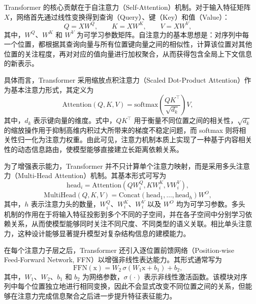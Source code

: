 Transformer 的核心贡献在于自注意力（Self-Attention）机制。对于输入特征矩阵 $X$，网络首先通过线性变换得到查询（Query）、键（Key）和值（Value）：
\begin{equation}
Q = XW^Q,\qquad
K = XW^K,\qquad
V = XW^V,
\end{equation}
其中，$W^Q$、$W^K$ 和 $W^V$ 为可学习参数矩阵。自注意力的基本思想是：对序列中每一个位置，都根据其查询向量与所有位置键向量之间的相似性，计算该位置对其他位置的关注程度，再对对应的值向量进行加权聚合，从而获得包含全局上下文信息的新表示。

具体而言，Transformer 采用缩放点积注意力（Scaled Dot-Product Attention）作为基本注意力形式，其定义为
\begin{equation}
\mathrm{Attention}(Q,K,V)
=
\mathrm{softmax}\left(\frac{QK^\top}{\sqrt{d_k}}\right)V,
\label{eq:transformer_attention}
\end{equation}
其中，$d_k$ 表示键向量的维度。式中，$QK^\top$ 用于衡量不同位置之间的相关性，$\sqrt{d_k}$ 的缩放操作用于抑制高维内积过大所带来的梯度不稳定问题，而 softmax 则将相关性归一化为注意力权重。由此可见，注意力机制本质上实现了一种基于内容相关性的动态信息路由，使模型能够直接建立长距离依赖关系。

为了增强表示能力，Transformer 并不只计算单个注意力映射，而是采用多头注意力（Multi-Head Attention）机制。其基本形式可写为
\begin{equation}
\mathrm{head}_i
=
\mathrm{Attention}(QW_i^Q,KW_i^K,VW_i^V),
\end{equation}
\begin{equation}
\mathrm{MultiHead}(Q,K,V)
=
\mathrm{Concat}(\mathrm{head}_1,\dots,\mathrm{head}_h)W^O,
\label{eq:transformer_multihead}
\end{equation}
其中，$h$ 表示注意力头的数量，$W_i^Q$、$W_i^K$、$W_i^V$ 以及 $W^O$ 均为可学习参数。多头机制的作用在于将输入特征投影到多个不同的子空间，并在各子空间中分别学习依赖关系，从而使模型能够同时关注不同尺度、不同类型的语义关联。相比单头注意力，这种设计能够显著提升模型对复杂结构信息的建模能力。

在每个注意力子层之后，Transformer 还引入逐位置前馈网络（Position-wise Feed-Forward Network\cite{vaswani2017attention}, FFN）以增强非线性表达能力。其形式通常写为
\begin{equation}
\mathrm{FFN}(\text{x})
=
W_2\,\sigma(W_1\text{x}+b_1)+b_2,
\label{eq:transformer_ffn}
\end{equation}
其中，$W_1$、$W_2$、$b_1$ 和 $b_2$ 为网络参数，$\sigma(\cdot)$ 表示非线性激活函数。该模块对序列中每个位置独立地进行相同变换，因此不会显式改变不同位置之间的关系，但能够在注意力完成信息聚合之后进一步提升特征表征能力。

